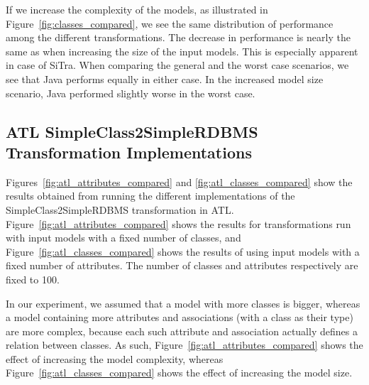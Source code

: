 \documentclass[12pt]{elsarticle}
\begin{document}
If we increase the complexity of the models, as illustrated in
Figure~\ref{fig:classes_compared}, we see the same distribution of performance
among the different transformations. The decrease in performance is nearly the
same as when increasing the size of the input models. This is especially
apparent in case of SiTra. When comparing the general and the worst case
scenarios, we see that Java performs equally in either case. In the increased
model size scenario, Java performed slightly worse in the worst case.

\subsection{ATL SimpleClass2SimpleRDBMS Transformation
Implementations}\label{subsec:atl_class2relational}

Figures~\ref{fig:atl_attributes_compared} and \ref{fig:atl_classes_compared}
show the results obtained from running the different implementations of the
SimpleClass2SimpleRDBMS transformation in ATL.
Figure~\ref{fig:atl_attributes_compared} shows the results for transformations
run with input models with a fixed number of classes, and
Figure~\ref{fig:atl_classes_compared} shows the results of using input models
with a fixed number of attributes. The number of classes and attributes respectively
are fixed to 100.

In our experiment, we assumed that a model with more classes is
bigger, whereas a model containing more attributes and associations (with a
class as their type) are more complex, because each such attribute and
association actually defines a relation between classes. As such,
Figure~\ref{fig:atl_attributes_compared} shows the effect of increasing the
model complexity, whereas Figure~\ref{fig:atl_classes_compared}
shows the effect of increasing the model size.\\
\end{document}
